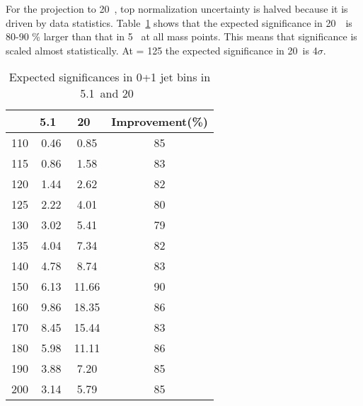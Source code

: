 For the projection to 20~\ifb, top normalization uncertainty is halved
because it is driven by data statistics. Table~\ref{tab:exp_sig_20fb} shows
that the expected significance in 20~\ifb~is 80-90 \% larger than that in 5~\ifb
at all mass points. This means that significance is scaled almost statistically.
At \mHi = 125 \GeV the expected  significance in 20~\ifb is 4$\sigma$.

\begin{table}[htb] 
	\centering
	\begin{tabular}{c | c c | c }
   	\hline \hline
	\mHi & 5.1~\ifb & 20~\ifb & Improvement(\%) \\
	\hline 
	110 & 0.46 & 0.85 & 85 \\
	115 & 0.86 & 1.58 & 83 \\
	120 & 1.44 & 2.62 & 82 \\
	125 & 2.22 & 4.01 & 80 \\
	130 & 3.02 & 5.41 & 79 \\
	135 & 4.04 & 7.34 & 82 \\
	140 & 4.78 & 8.74 & 83 \\
	150 & 6.13 & 11.66 & 90 \\
	160 & 9.86 & 18.35 & 86 \\
	170 & 8.45 & 15.44 & 83 \\
	180 & 5.98 & 11.11 & 86 \\
	190 & 3.88 & 7.20 & 85 \\
	200 & 3.14 & 5.79 & 85 \\
   	\hline \hline
	\end{tabular}
	\caption{Expected significances in 0+1 jet bins in 5.1~\ifb and 20~\ifb}
	\label{tab:exp_sig_20fb}
\end{table} 
